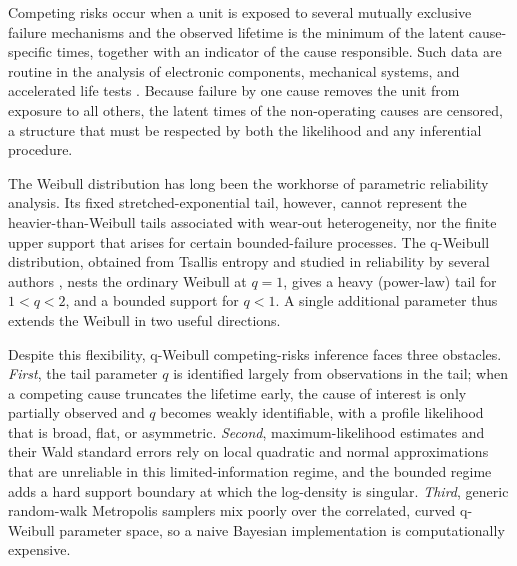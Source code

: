 \documentclass[ASNA,twocolumn]{USG}
\begin{document}
Competing risks occur when a unit is exposed to several mutually exclusive
failure mechanisms and the observed lifetime is the minimum of the latent
cause-specific times, together with an indicator of the cause responsible.
Such data are routine in the analysis of electronic components, mechanical
systems, and accelerated life tests \cite{crowder2001,pintilie2006}. Because failure by one cause removes
the unit from exposure to all others, the latent times of the non-operating
causes are censored, a structure that must be respected by both the
likelihood and any inferential procedure.

The Weibull distribution has long been the workhorse of parametric
reliability analysis. Its fixed stretched-exponential tail, however, cannot
represent
the heavier-than-Weibull tails associated with wear-out heterogeneity, nor
the finite upper support that arises for certain bounded-failure processes.
The q-Weibull distribution, obtained from Tsallis entropy
\cite{tsallis1988} and studied in reliability by several authors
\cite{costa2006,jose2009}, nests the ordinary Weibull at $q=1$, gives a
heavy (power-law) tail for $1<q<2$, and a bounded support for $q<1$. A single
additional parameter thus extends the Weibull in two useful directions.

Despite this flexibility, q-Weibull competing-risks inference faces three
obstacles. \emph{First}, the tail parameter $q$ is identified largely from
observations in the tail; when a competing cause truncates the lifetime
early, the cause of interest is only partially observed and $q$ becomes
weakly identifiable, with a profile likelihood that is broad, flat, or
asymmetric. \emph{Second}, maximum-likelihood estimates and their Wald
standard errors rely on local quadratic and normal approximations that are
unreliable in this limited-information regime, and the bounded regime adds a
hard support boundary at which the log-density is singular. \emph{Third},
generic random-walk Metropolis samplers mix poorly over the correlated,
curved q-Weibull parameter space, so a naive Bayesian implementation is
computationally expensive.
\end{document}
